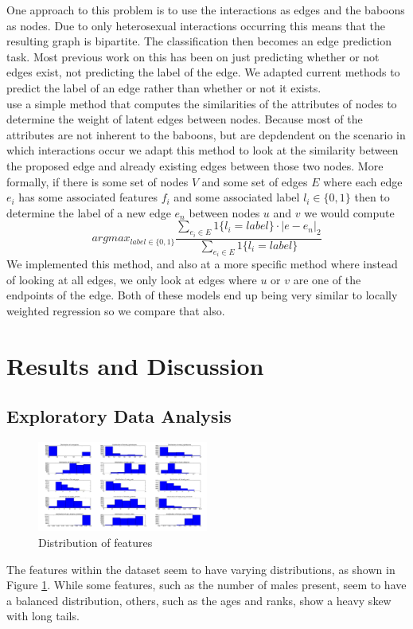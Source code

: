 \documentclass[twoside,twocolumn,paper=letter]{article}
\begin{document}
One approach to this problem is to use the interactions as edges and the baboons as nodes. Due to only heterosexual interactions occurring this means that the resulting graph is bipartite. The classification then becomes  an edge prediction task. Most previous work on this has been on just predicting whether or not edges exist, not predicting the label of the edge. We adapted current methods to predict the label of an edge rather than whether or not it exists. \\
\cite{Macskassy:2007} use a simple method that computes the similarities of the attributes of nodes to determine the weight of latent edges between nodes. Because most of the attributes are not inherent to the baboons, but are depdendent on the scenario in which interactions occur we adapt this method to look at the similarity between the proposed edge and already existing edges between those two nodes. More formally, if there is some set of nodes $V$ and some set of edges $E$ where each edge $e_i$ has some associated features $f_i$ and some associated label $l_i\in \{0,1\}$ then to determine the label of a new edge $e_n$ between nodes $u$ and $v$ we would compute 
$$argmax_{label \in \{0,1\}} \frac{\sum_{e_i \in E}1\{l_i=label\}\cdot|e-e_n|_2}{\sum_{e_i \in E}1\{l_i=label\}}$$
We implemented this method, and also at a more specific method where instead of looking at all edges, we only look at edges where $u$ or $v$ are one of the endpoints of the edge. Both of these models end up being very similar to locally weighted regression so we compare that also. 
\section{Results and Discussion}
\subsection{Exploratory Data Analysis}
\begin{figure}
      \centering
          \includegraphics[width=0.5\textwidth]{../figs/all_feats_histogram.png}
  \caption{Distribution of features}
  \label{fig:figure_distrib}
\end{figure}
The features within the dataset seem to have varying distributions, as shown in
Figure \ref{fig:figure_distrib}. While some features, such as the number of
males present, seem to have a balanced distribution, others, such as the ages
and ranks, show a heavy skew with long tails.
\end{document}
